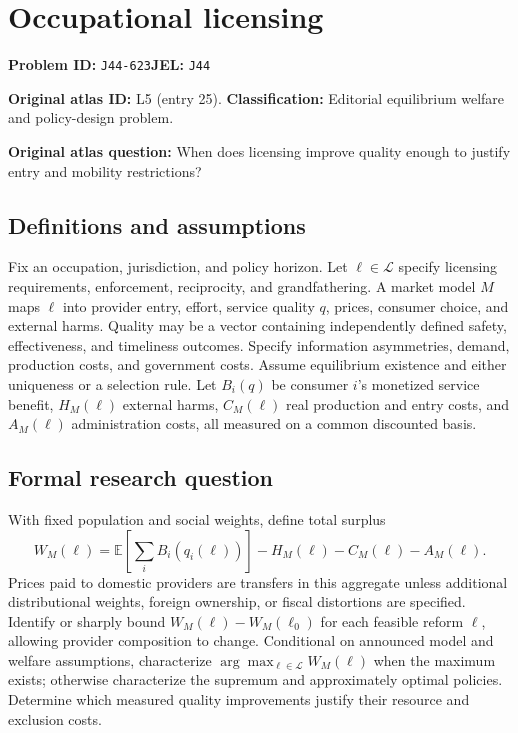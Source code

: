 \documentclass[11pt,a4paper]{article}
\begin{document}
\section*{Occupational licensing}
\textbf{Problem ID:} \texttt{J44-623}\quad \textbf{JEL:} \texttt{J44}\par
\label{problem:OP-0025}
\label{atlas:prob:L5}
\noindent\textbf{Original atlas ID:} L5 (entry 25). \textbf{Classification:} Editorial equilibrium welfare and policy-design problem.

\noindent\textbf{Original atlas question:} When does licensing improve quality enough to justify entry and mobility restrictions?

\subsection*{Definitions and assumptions}
Fix an occupation, jurisdiction, and policy horizon. Let $\ell\in\mathcal L$ specify licensing requirements, enforcement, reciprocity, and grandfathering. A market model $M$ maps $\ell$ into provider entry, effort, service quality $q$, prices, consumer choice, and external harms. Quality may be a vector containing independently defined safety, effectiveness, and timeliness outcomes. Specify information asymmetries, demand, production costs, and government costs. Assume equilibrium existence and either uniqueness or a selection rule. Let $B_i(q)$ be consumer $i$'s monetized service benefit, $H_M(\ell)$ external harms, $C_M(\ell)$ real production and entry costs, and $A_M(\ell)$ administration costs, all measured on a common discounted basis.
\subsection*{Formal research question}
With fixed population and social weights, define total surplus
\[
 W_M(\ell)=\mathbb E\left[\sum_i B_i(q_i(\ell))\right]
             -H_M(\ell)-C_M(\ell)-A_M(\ell).
\]
Prices paid to domestic providers are transfers in this aggregate unless additional distributional weights, foreign ownership, or fiscal distortions are specified. Identify or sharply bound $W_M(\ell)-W_M(\ell_0)$ for each feasible reform $\ell$, allowing provider composition to change. Conditional on announced model and welfare assumptions, characterize $\arg\max_{\ell\in\mathcal L}W_M(\ell)$ when the maximum exists; otherwise characterize the supremum and approximately optimal policies. Determine which measured quality improvements justify their resource and exclusion costs.
\end{document}
